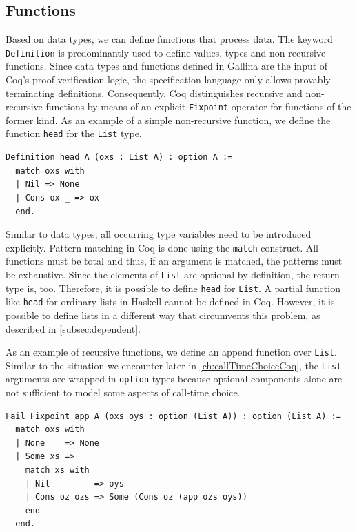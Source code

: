 \documentclass[a4paper, 11pt, fleqn, twoside]{scrreprt}
\newcommand{\cinl}[1]{\texttt{#1}}
\begin{document}
\subsection{Functions}

Based on data types, we can define functions that process data.
The keyword \cinl{Definition} is predominantly used to define values, types and non-recursive functions.
Since data types and functions defined in Gallina are the input of Coq's proof verification logic, the specification language only allows provably terminating definitions.
Consequently, Coq distinguishes recursive and non-recursive functions by means of an explicit \cinl{Fixpoint} operator for functions of the former kind.
As an example of a simple non-recursive function, we define the function \cinl{head} for the \cinl{List} type.

\begin{verbatim}
Definition head A (oxs : List A) : option A :=
  match oxs with
  | Nil => None
  | Cons ox _ => ox
  end.
\end{verbatim}

Similar to data types, all occurring type variables need to be introduced explicitly.
Pattern matching in Coq is done using the \cinl{match} construct.
All functions must be total and thus, if an argument is matched, the patterns must be exhaustive.
Since the elements of \cinl{List} are optional by definition, the return type is, too.
Therefore, it is possible to define \cinl{head} for \cinl{List}.
A partial function like \cinl{head} for ordinary lists in Haskell cannot be defined in Coq.
However, it is possible to define lists in a different way that circumvents this problem, as described in \autoref{subsec:dependent}.

As an example of recursive functions, we define an append function over \cinl{List}.
Similar to the situation we encounter later in \autoref{ch:callTimeChoiceCoq}, the \cinl{List} arguments are wrapped in \cinl{option} types because optional components alone are not sufficient to model some aspects of call-time choice.

\begin{verbatim}
Fail Fixpoint app A (oxs oys : option (List A)) : option (List A) :=
  match oxs with
  | None    => None
  | Some xs =>
    match xs with
    | Nil         => oys
    | Cons oz ozs => Some (Cons oz (app ozs oys))
    end
  end.
\end{verbatim}
\end{document}
